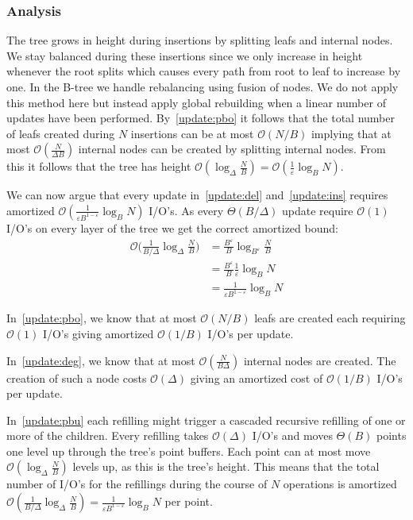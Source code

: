 \documentclass[twoside,11pt,openright]{report}
\def \epsilon {\varepsilon}
\begin{document}
\subsubsection*{Analysis}
The tree grows in height during insertions by splitting leafs and internal nodes. We stay balanced during these insertions since we only increase in height whenever the root splits which causes every path from root to leaf to increase by one. In the B-tree we handle rebalancing using fusion of nodes. We do not apply this method here but instead apply global rebuilding when a linear number of updates have been performed. By~\ref{update:pbo} it follows that the total number of leafs created during $N$ insertions can be at most $\mathcal{O}(N/B)$ implying that at most $\mathcal{O}(\frac{N}{\Delta B})$ internal nodes can be created by splitting internal nodes. From this it follows that the tree has height $\mathcal{O}(\log_\Delta \frac{N}{B}) = \mathcal{O}(\frac{1}{\epsilon} \log_B N)$.

We can now argue that every update in~\ref{update:del} and~\ref{update:ins} requires amortized $\mathcal{O}(\frac{1}{\epsilon B^{1-\epsilon}} \log_B N)$ I/O's. As every $\Theta (B/\Delta)$ update require $\mathcal{O}(1)$ I/O's on every layer of the tree we get the correct amortized bound:
\begin{align*}
\mathcal{O}\bigg(\frac{1}{B/\Delta} \log_\Delta \frac{N}{B}\bigg) &= \frac{B^\epsilon}{B} \log_{B^\epsilon} \frac{N}{B} \\
&= \frac{B^\epsilon}{B} \frac{1}{\epsilon} \log_{B} N \\
&= \frac{1}{\epsilon B^{1-\epsilon}} \log_B N
\end{align*}

In~\ref{update:pbo}, we know that at most $\mathcal{O}(N/B)$ leafs are created each requiring $\mathcal{O}(1)$ I/O's giving amortized $\mathcal{O}(1/B)$ I/O's per update.

In~\ref{update:deg}, we know that at most $\mathcal{O}(\frac{N}{B\Delta})$ internal nodes are created. The creation of such a node costs $\mathcal{O}(\Delta)$ giving an amortized cost of $\mathcal{O}(1/B)$ I/O's per update.

In~\ref{update:pbu} each refilling might trigger a cascaded recursive refilling of one or more of the children. Every refilling takes $\mathcal{O}(\Delta)$ I/O's and moves $\Theta(B)$ points one level up through the tree's point buffers. Each point can at most move $\mathcal{O}(\log_\Delta \frac{N}{B})$ levels up, as this is the tree's height. This means that the total number of I/O's for the refillings during the course of $N$ operations is amortized $\mathcal{O}(\frac{1}{B/\Delta} \log_\Delta \frac{N}{B}) = \frac{1}{\epsilon B^{1-\epsilon}} \log_B N$ per point.
\end{document}
